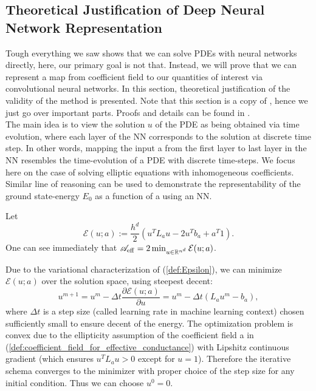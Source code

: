 \subsection{Theoretical Justification of Deep Neural Network Representation}
Tough everything we saw shows that we can solve PDEs with neural networks directly, here, our primary goal is not that. Instead, we will prove that we can represent a map from coefficient field to our quantities of interest via convolutional neural networks. In this section, theoretical justification of the validity of the method is presented. Note that this section is a copy of \cite{Base_paper}, hence we just go over important parts. Proofs and details can be found in \cite{Base_paper}.\\
The main idea is to view the solution $u$ of the PDE as being obtained via time evolution, where each layer of the NN corresponds to the solution at discrete time step. In other words, mapping the input a from the first layer to last layer in the NN resembles the time-evolution of a PDE with discrete time-steps. We focus here on the case of solving elliptic equations with inhomogeneous coefficients. Similar line of reasoning can be used to demonstrate the representability of the ground state-energy $E_0$ as a function of a using an NN.
\begin{assumption}
	Let 
	\begin{equation}
		\label{def:Epsilon}
		\mathcal{E}(u;a) := \frac{h^d}{2} (u^T L_a u - 2u^T b_a + a^T 1).
	\end{equation} 
	One can see immediately that $\mathscr{A}_{\operatorname{eff}} = 2 \min_{u\in \mathbb{R}^{n^d}} \mathcal{E}(u;a)$.
\end{assumption} 
Due to the variational characterization of (\ref{def:Epsilon}), we can minimize $\mathcal{E}(u;a)$ over the solution space, using steepest decent:
\begin{equation}
	\label{steepest_decent}
	u^{m+1} = u^m - \Delta t \frac{\partial \mathcal{E}(u;a)}{\partial u} = u^m - \Delta t( L_a u^m - b_a),
\end{equation}
where $\Delta t$ is a step size (called learning rate in machine learning context) chosen sufficiently small to ensure decent of the energy. The optimization problem is convex due to the ellipticity assumption of the coefficient field a in (\ref{def:coefficient_field_for_effective_conductance}) with Lipshitz continuous gradient (which ensures $u^T L_a u > 0$ except for $u=1$). Therefore the iterative schema converges to the minimizer with proper choice of the step size for any initial condition. Thus we can choose $u^0 = 0$.\\
